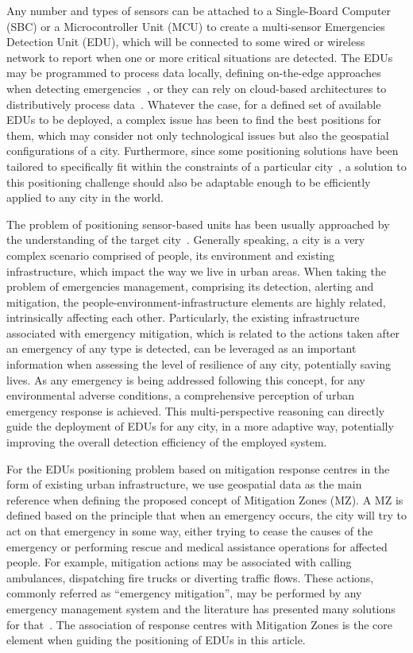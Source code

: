\begin{refsection}
Any number and types of sensors can be attached to a Single-Board Computer (SBC) or a Microcontroller Unit (MCU) to create a multi-sensor Emergencies Detection Unit (EDU), which will be connected to some wired or wireless network to report when one or more critical situations are detected. The EDUs may be programmed to process data locally, defining on-the-edge approaches when detecting emergencies~\cite{smartcitiesedge}, or they can rely on cloud-based architectures to distributively process data~\cite{smarticiteshibrid}. Whatever the case, for a defined set of available EDUs to be deployed, a complex issue has been to find the best positions for them, which may consider not only technological issues but also the geospatial configurations of a city. Furthermore, since some positioning solutions have been tailored to specifically fit within the constraints of a particular city~\cite{positions1,positions2}, a solution to this positioning challenge should also be adaptable enough to be efficiently applied to any city in the world. 

The problem of positioning sensor-based units has been usually approached by the understanding of the target city~\cite{spatial2}. Generally speaking, a city is a very complex scenario comprised of people, its environment and existing infrastructure, which impact the way we live in urban areas. When taking the problem of emergencies management, comprising its detection, alerting and mitigation, the people-environment-infrastructure elements are highly related, intrinsically affecting each other. Particularly, the existing infrastructure associated with emergency mitigation, which is related to the actions taken after an emergency of any type is detected, can be leveraged as an important information when assessing the level of resilience of any city, potentially saving lives. As any emergency is being addressed following this concept, for any environmental adverse conditions, a comprehensive perception of urban emergency response is achieved. This multi-perspective reasoning can directly guide the deployment of EDUs for any city, in a more adaptive way, potentially improving the overall detection efficiency of the employed system.

For the EDUs positioning problem based on mitigation response centres in the form of existing urban infrastructure, we use geospatial data as the main reference when defining the proposed concept of Mitigation Zones (MZ). A MZ is defined based on the principle that when an emergency occurs, the city will try to act on that emergency in some way, either trying to cease the causes of the emergency or performing rescue and medical assistance operations for affected people. For example, mitigation actions may be associated with calling ambulances, dispatching fire trucks or diverting traffic flows. These actions, commonly referred as ``emergency mitigation'', may be performed by any emergency management system and the literature has presented many solutions for that~\cite{surveyEmergencies,mitigation1,mitigation2}. The association of response centres with Mitigation Zones is the core element when guiding the positioning of EDUs in this article.


\end{refsection}
